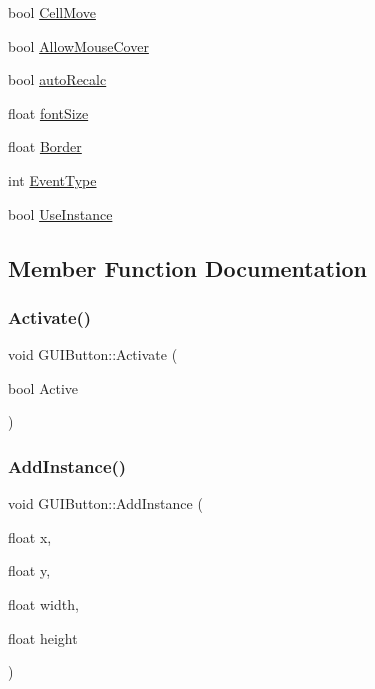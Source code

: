 \begin{DoxyCompactItemize}
\item 
bool \hyperlink{class_g_u_i_button_ae4e6ce4a556091f8451d13ffd82febef}{Cell\+Move}
\item 
bool \hyperlink{class_g_u_i_button_a90bbc4fe0c242a4fa2ae4a28e826748a}{Allow\+Mouse\+Cover}
\item 
bool \hyperlink{class_g_u_i_button_a51296557b89169c437bfdcd9a47a1434}{auto\+Recalc}
\item 
float \hyperlink{class_g_u_i_button_adcf183913688e46b9e173de16f7a2481}{font\+Size}
\item 
float \hyperlink{class_g_u_i_button_af653c2e8ebc5c46f4551141f0f4d4bbc}{Border}
\item 
int \hyperlink{class_g_u_i_button_af6814a8e41a11c991889dd6000bd0fc9}{Event\+Type}
\item 
bool \hyperlink{class_g_u_i_button_ae3c615b3fa47421c6245718534de9a13}{Use\+Instance}
\end{DoxyCompactItemize}


\subsection{Member Function Documentation}
\hypertarget{class_g_u_i_button_a76d0c53b84ad511029dfe4d2d7225d20}{}\label{class_g_u_i_button_a76d0c53b84ad511029dfe4d2d7225d20} 
\subsubsection{\texorpdfstring{Activate()}{Activate()}}
{\footnotesize\ttfamily void G\+U\+I\+Button\+::\+Activate (\begin{DoxyParamCaption}\item[{bool}]{Active }\end{DoxyParamCaption})}

\hypertarget{class_g_u_i_button_a10e7ff6887b7c7b6e40efe3992f5ad9a}{}\label{class_g_u_i_button_a10e7ff6887b7c7b6e40efe3992f5ad9a} 
\subsubsection{\texorpdfstring{Add\+Instance()}{AddInstance()}}
{\footnotesize\ttfamily void G\+U\+I\+Button\+::\+Add\+Instance (\begin{DoxyParamCaption}\item[{float}]{x,  }\item[{float}]{y,  }\item[{float}]{width,  }\item[{float}]{height }\end{DoxyParamCaption})}

